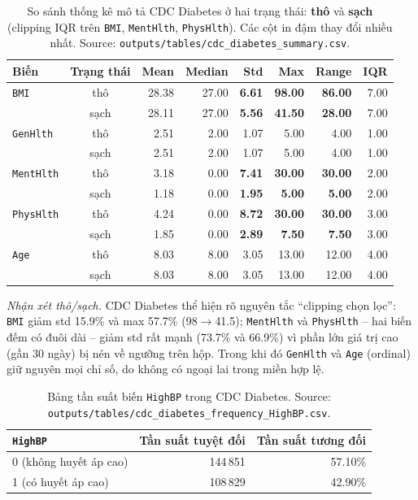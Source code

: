 \begin{table}[H]
\centering
\caption[Thống kê thô/sạch CDC Diabetes]{So sánh thống kê mô tả CDC Diabetes ở hai trạng thái: \textbf{thô} và \textbf{sạch} (clipping IQR trên \texttt{BMI}, \texttt{MentHlth}, \texttt{PhysHlth}). Các cột in đậm thay đổi nhiều nhất. Source: \texttt{outputs/tables/cdc\_diabetes\_summary.csv}.}
\label{tab:ch4_cdc_stats_raw_clean}
\footnotesize
\setlength{\tabcolsep}{4pt}
\begin{tabular}{lcrrrrrr}
\toprule
Biến & Trạng thái & Mean & Median & \textbf{Std} & \textbf{Max} & \textbf{Range} & IQR \\
\midrule
\texttt{BMI} & thô & 28.38 & 27.00 & \textbf{6.61} & \textbf{98.00} & \textbf{86.00} & 7.00 \\
 & sạch & 28.11 & 27.00 & \textbf{5.56} & \textbf{41.50} & \textbf{28.00} & 7.00 \\
\midrule
\texttt{GenHlth} & thô & 2.51 & 2.00 & 1.07 & 5.00 & 4.00 & 1.00 \\
 & sạch & 2.51 & 2.00 & 1.07 & 5.00 & 4.00 & 1.00 \\
\midrule
\texttt{MentHlth} & thô & 3.18 & 0.00 & \textbf{7.41} & \textbf{30.00} & \textbf{30.00} & 2.00 \\
 & sạch & 1.18 & 0.00 & \textbf{1.95} & \textbf{5.00} & \textbf{5.00} & 2.00 \\
\midrule
\texttt{PhysHlth} & thô & 4.24 & 0.00 & \textbf{8.72} & \textbf{30.00} & \textbf{30.00} & 3.00 \\
 & sạch & 1.85 & 0.00 & \textbf{2.89} & \textbf{7.50} & \textbf{7.50} & 3.00 \\
\midrule
\texttt{Age} & thô & 8.03 & 8.00 & 3.05 & 13.00 & 12.00 & 4.00 \\
 & sạch & 8.03 & 8.00 & 3.05 & 13.00 & 12.00 & 4.00 \\
\bottomrule
\end{tabular}
\end{table}

\textit{Nhận xét thô/sạch.} CDC Diabetes thể hiện rõ nguyên tắc ``clipping chọn lọc'': \texttt{BMI} giảm std 15.9\% và max 57.7\% (98$\to$41.5); \texttt{MentHlth} và \texttt{PhysHlth} -- hai biến đếm có đuôi dài -- giảm std rất mạnh (73.7\% và 66.9\%) vì phần lớn giá trị cao (gần 30 ngày) bị nén về ngưỡng trên hộp. Trong khi đó \texttt{GenHlth} và \texttt{Age} (ordinal) giữ nguyên mọi chỉ số, do không có ngoại lai trong miền hợp lệ.

\begin{table}[H]
\centering
\caption[Bảng tần suất biến \texttt{HighBP} trong CDC Diabetes]{Bảng tần suất biến \texttt{HighBP} trong CDC Diabetes. Source: \texttt{outputs/tables/cdc\_diabetes\_frequency\_HighBP.csv}.}
\label{tab:ch4_cdc_frequency}
\small
\begin{tabular}{lrr}
\toprule
\texttt{HighBP} & Tần suất tuyệt đối & Tần suất tương đối \\
\midrule
0 (không huyết áp cao) & 144\,851 & 57.10\% \\
1 (có huyết áp cao) & 108\,829 & 42.90\% \\
\bottomrule
\end{tabular}
\end{table}


